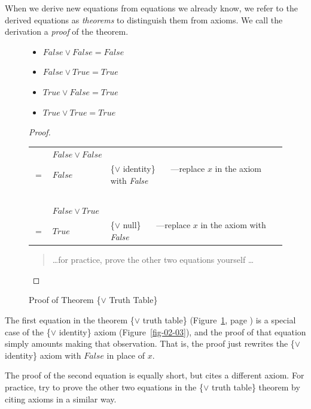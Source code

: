 When we derive new equations from equations we already know,
we refer to the derived equations as \emph{theorems} to
distinguish them from axioms.
We call the derivation a
\emph{proof} of the theorem.

\begin{figure}
\begin{theorem}
\mbox{}
\begin{itemize}
\item $False \vee False = False$
\item $False \vee True  = True$
\item $True  \vee False = True$
\item $True  \vee True  = True$
\end{itemize}
\end{theorem}

\begin{proof}
\mbox{}\\
\begin{tabular}{lll}
    &$False \vee False$    & \\
$=$ & $False$              & \{$\vee$ identity\}  ~~~---replace $x$ in the axiom with \emph{False}\\
    &  ~                   & \\
    & $False \vee True$    & \\
$=$ & $True$               & \{$\vee$ null\}  ~~~---replace $x$ in the axiom with \emph{False}\\
\end{tabular}
\begin{quote}
\dots for practice, prove the other two equations yourself \dots
\end{quote}
\end{proof}
\caption{Proof of Theorem \{$\vee$ Truth Table\}}
\label{or-truth-table}
\end{figure}

The first equation in the theorem \{$\vee$ truth table\}
(Figure~\ref{or-truth-table}, page \pageref{or-truth-table})
is a special case of the
\{$\vee$ identity\} axiom (Figure~\ref{fig-02-03}),
and the proof of that equation simply amounts making that observation.
That is, the proof just rewrites the \{$\vee$ identity\} axiom
with $False$ in place of $x$.

The proof of the second equation is equally short, but cites
a different axiom.
For practice, try to prove the other two
equations in the \{$\vee$ truth table\} theorem
by citing axioms in a similar way.

